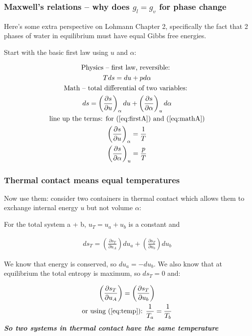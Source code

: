 \documentclass[hyperref={colorlinks=true,linkcolor=blue,urlcolor=blue},numbers]{beamer}
\begin{document}
\begin{frame}
  \frametitle{Maxwell's relations -- why does $g_l = g_v$ for phase change}

Here's some extra perspective on Lohmann Chapter 2, specifically the fact that 2 phases of water in equilibrium must have equal Gibbs free energies.

Start with the basic first law using $u$ and $\alpha$:

  \begin{subequations}
  \begin{gather}
    \text{Physics -- first law, reversible: }\nonumber \\
Tds = du  + p d \alpha \label{eq:firstA}\\
\text{Math -- total differential of two variables: } \nonumber\\
ds = \left ( \frac{\partial s }{\partial u}   \right )_\alpha du + 
\left (  \frac{ \partial s}{ \partial \alpha}  \right )_u d\alpha \label{eq:mathA}\\
\text{line up the terms: for (\ref{eq:firstA}) and (\ref{eq:mathA})} \nonumber\\
\left ( \frac{\partial s }{\partial u}   \right )_\alpha = \frac{ 1}{T} \label{eq:temp}\\
\left (  \frac{ \partial s}{ \partial \alpha}  \right )_u = \frac{p }{T}\label{eq:press} 
  \end{gather}
  \end{subequations}
\end{frame}

\begin{frame}
  \frametitle{Thermal contact means equal temperatures}
Now use them:  consider two containers in thermal contact which
allows them to exchange internal energy $u$ but not volume $\alpha$:

For the total system a + b, $u_{T} = u_a + u_b$ is a constant and

\begin{gather*}
  ds_{T} = \left ( \frac{\partial s_T }{\partial u_A}   \right ) du_a
+ \left ( \frac{\partial s_T }{\partial u_b} \right ) du_b
\end{gather*}

We know that energy is conserved, so $du_a = -du_b$.  We also know that
at equilibrium the total entropy is maximum, so $ds_T = 0$ and:

\begin{gather}
  \left ( \frac{\partial s_T }{\partial u_A} \right ) 
= \left ( \frac{\partial s_T }{\partial u_b} \right )\nonumber\\
\text{or using (\ref{eq:temp}): } \frac{ 1}{T_a}  = \frac{ 1}{T_b} 
\label{eq:thetemp}
\end{gather}
\textit{\textbf{So two systems in thermal contact have the same temperature}}

\end{frame}
\end{document}
